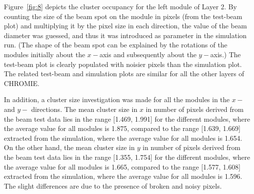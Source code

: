 \documentclass[a4paper,11pt]{article}
\begin{document}
Figure~\ref{fig:8} depicts the cluster occupancy for the left module of Layer 2. By counting the size of the beam spot on the module in pixels (from the test-beam plot) and multiplying it by the pixel size in each direction, the value of the beam diameter was guessed, and thus it was introduced as parameter in the simulation run. (The shape of the beam spot can be explained by the rotations of the modules initially about the $x-$axis and subsequently about the $y-$axis.) The test-beam plot is clearly populated with noisier pixels than the simulation plot. The related test-beam and simulation plots are similar for all the other layers of CHROMIE.

In addition, a cluster size investigation was made for all the modules in the $x-$ and $y-$ directions. The mean cluster size in $x$ in number of pixels derived from the beam test data lies in the range [1.469, 1.991] for the different modules, where the average value for all modules is 1.875, compared to the range [1.639, 1.669] extracted from the simulation, where the average value for all modules is 1.654. On the other hand, the mean cluster size in $y$ in number of pixels derived from the beam test data lies in the range [1.355, 1.754] for the different modules, where the average value for all modules is 1.665, compared to the range [1.577, 1.608] extracted from the simulation, where the average value for all modules is 1.596. The slight differences are due to the presence of broken and noisy pixels.
\end{document}
